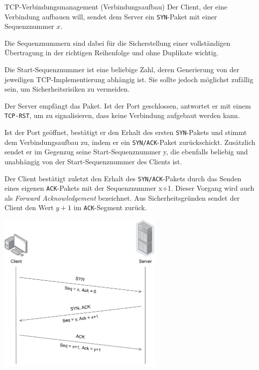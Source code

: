 \begin{defi}{TCP-Verbindungsmanagement (Verbindungsaufbau)}
    Der Client, der eine Verbindung aufbauen will, sendet dem Server ein \texttt{SYN}-Paket mit einer Sequenznummer $x$.

    Die Sequenznummern sind dabei für die Sicherstellung einer vollständigen Übertragung in der richtigen Reihenfolge und ohne Duplikate wichtig.

    Die Start-Sequenznummer ist eine beliebige Zahl, deren Generierung von der jeweiligen TCP-Implementierung abhängig ist.
    Sie sollte jedoch möglichst zufällig sein, um Sicherheitsrisiken zu vermeiden.

    Der Server empfängt das Paket. Ist der Port geschlossen, antwortet er mit einem \texttt{TCP-RST}, um zu signalisieren, dass keine Verbindung aufgebaut werden kann.

    Ist der Port geöffnet, bestätigt er den Erhalt des ersten \texttt{SYN}-Pakets und stimmt dem Verbindungsaufbau zu, indem er ein \texttt{SYN/ACK}-Paket zurückschickt.
    Zusätzlich sendet er im Gegenzug seine Start-Sequenznummer y, die ebenfalls beliebig und unabhängig von der Start-Sequenznummer des Clients ist.

    Der Client bestätigt zuletzt den Erhalt des \texttt{SYN/ACK}-Pakets durch das Senden eines eigenen \texttt{ACK}-Pakets mit der Sequenznummer x+1. Dieser Vorgang wird auch als \emph{Forward Acknowledgement} bezeichnet.
    Aus Sicherheitsgründen sendet der Client den Wert $y+1$ im \texttt{ACK}-Segment zurück.

    \centering
    \includegraphics[width=0.6\textwidth]{includes/figures/defi_tcp_verbindungsaufbau.pdf}
\end{defi}

